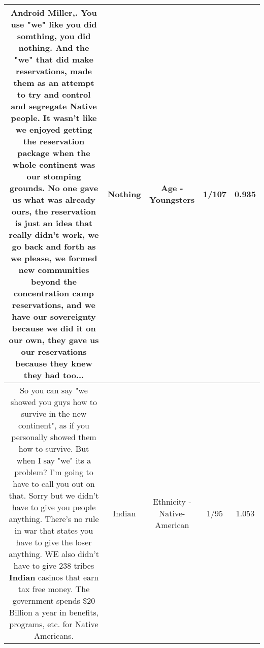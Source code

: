 \documentclass[11pt]{article}
\newlength\mylength
\begin{document}
\begin{center}
\begin{longtable}{|C{.65\mylength}|C{.30\mylength}|C{.12\mylength}|C{.12\mylength}|C{.12\mylength}|}
  \small Android Miller,. You use "we" like you did somthing, you did \textbf{nothing}. And the "we" that did make reservations, made them as an attempt to try and control and segregate Native people. It wasn't like we enjoyed getting the reservation package when the whole continent was our stomping grounds. No one gave us what was already ours, the reservation is just an idea that really didn't work, we go back and forth as we please, we formed new communities beyond the concentration camp reservations, and we have our sovereignty because we did it on our own, they gave us our reservations because they knew they had too...\normalsize   & Nothing & Age - Youngsters & 1/107 & 0.935 \\  \hline
  \small So you can say "we showed you guys how to survive in the new continent", as if you personally showed them how to survive. But when I say "we" its a problem? I'm going to have to call you out on that. Sorry but we didn't have to give you people anything.  There's no rule in war that states you have to give the loser anything.  WE also didn't have to give 238 tribes \textbf{Indian} casinos that earn tax free money.  The government spends \$20 Billion a year in benefits, programs, etc. for Native Americans.\normalsize   & Indian & Ethnicity - Native-American & 1/95 & 1.053 \\  \hline

\end{longtable}
\end{center}
\end{document}
